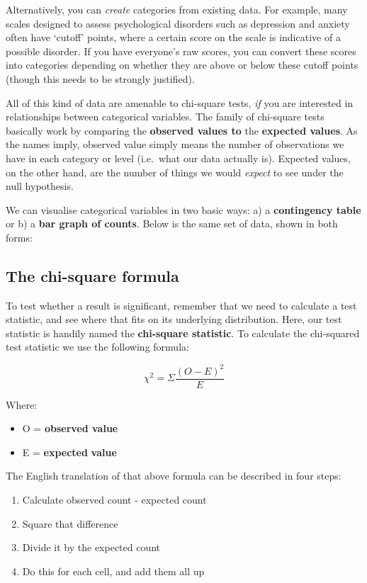 \documentclass[
]{book}
\begin{document}
Alternatively, you can \emph{create} categories from existing data. For example, many scales designed to assess psychological disorders such as depression and anxiety often have `cutoff' points, where a certain score on the scale is indicative of a possible disorder. If you have everyone's raw scores, you can convert these scores into categories depending on whether they are above or below these cutoff points (though this needs to be strongly justified).

All of this kind of data are amenable to chi-square tests, \emph{if} you are interested in relationships between categorical variables. The family of chi-square tests basically work by comparing the \textbf{observed values to} the \textbf{expected values}. As the names imply, observed value simply means the number of observations we have in each category or level (i.e.~what our data actually is). Expected values, on the other hand, are the number of things we would \emph{expect} to see under the null hypothesis.

We can visualise categorical variables in two basic ways: a) a \textbf{contingency table} or b) a \textbf{bar graph of counts}. Below is the same set of data, shown in both forms:

\hypertarget{the-chi-square-formula}{%
\subsection{The chi-square formula}\label{the-chi-square-formula}}

To test whether a result is significant, remember that we need to calculate a test statistic, and see where that fits on its underlying distribution. Here, our test statistic is handily named the \textbf{chi-square statistic}. To calculate the chi-squared test statistic we use the following formula:

\[
\chi^2 = \Sigma \frac{(O-E)^2}{E}
\]

Where:

\begin{itemize}
\item
  O = \textbf{observed value}
\item
  E = \textbf{expected} \textbf{value}
\end{itemize}

The English translation of that above formula can be described in four steps:

\begin{enumerate}
\def\labelenumi{\arabic{enumi}.}
\item
  Calculate observed count - expected count
\item
  Square that difference
\item
  Divide it by the expected count
\item
  Do this for each cell, and add them all up
\end{enumerate}
\end{document}
